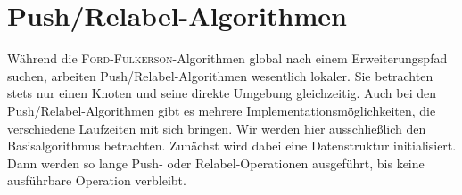 \documentclass[12pt,a4paper,titlepage,onecolumn,ngerman,bibliography=totocnumbered]{scrartcl}
\theoremstyle{definition}
\theoremstyle{remark}
\newcommand{\ff}{\textsc{Ford-Fulkerson}}
\newcommand{\pr}{Push/Relabel}
\begin{document}
\begin{figure}[H]
	\centering
	\caption{}
	\label{fig:bad_path}
\end{figure}

\newpage
\section{\pr -Algorithmen}
Während die \ff -Algorithmen global nach einem Erweiterungspfad suchen, arbeiten \pr -Algorithmen wesentlich lokaler.
Sie betrachten stets nur einen Knoten und seine direkte Umgebung gleichzeitig.
Auch bei den \pr -Algorithmen gibt es mehrere Implementationsmöglichkeiten, die verschiedene Laufzeiten mit sich bringen.
Wir werden hier ausschließlich den Basisalgorithmus betrachten.
Zunächst wird dabei eine Datenstruktur initialisiert.
Dann werden so lange Push- oder Relabel-Operationen ausgeführt, bis keine ausführbare Operation verbleibt.
\end{document}
